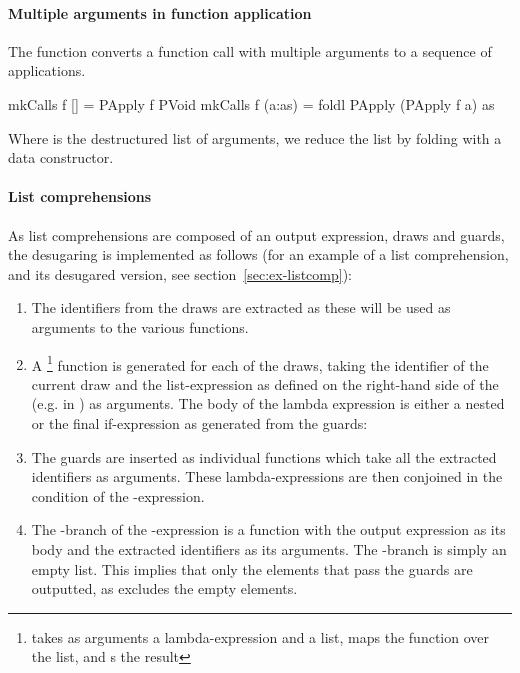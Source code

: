 \paragraph{Multiple arguments in function application}
The  function converts a function call with multiple arguments to a sequence of applications.

\begin{haskell}
mkCalls f [] = PApply f PVoid
mkCalls f (a:as) = foldl PApply (PApply f a) as
\end{haskell}

Where  is the destructured list of arguments, we reduce the list by folding with a  data constructor.

\paragraph{List comprehensions}
As list comprehensions are composed of an output expression, draws and guards, the desugaring is implemented as follows (for an example of a list comprehension, and its desugared version, see section~\ref{sec:ex-listcomp}):

\begin{enumerate}
\item The identifiers from the draws are extracted as these will be used as arguments to the various functions.

\item A \footnote{ takes as arguments a lambda-expression and a list, maps the function over the list, and s the result} function is generated for each of the draws, taking the identifier of the current draw and the list-expression as defined on the right-hand side of the \code{<-} (e.g. \code{[1, 2, 3]} in ) as arguments. The body of the lambda expression is either a nested  or the final if-expression as generated from the guards:

\item The guards are inserted as individual functions which take all the extracted identifiers as arguments. These lambda-expressions are then conjoined in the condition of the -expression.

\item The -branch of the -expression is a function with the output expression as its body and the extracted identifiers as its arguments. The -branch is simply an empty list. This implies that only the elements that pass the guards are outputted, as  excludes the empty elements.
\end{enumerate}


